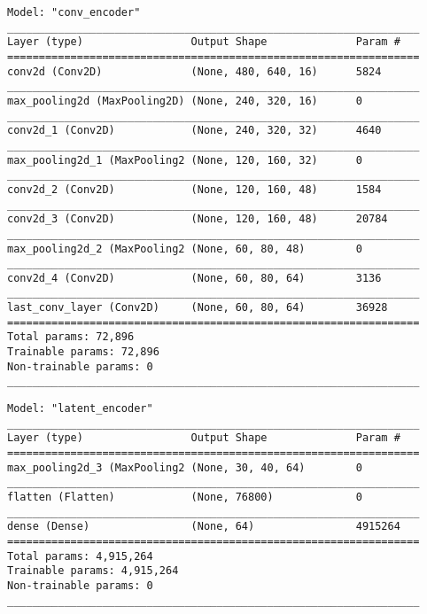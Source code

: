 \documentclass[12pt]{article}
\begin{document}
\begin{verbatim}
Model: "conv_encoder"
_________________________________________________________________
Layer (type)                 Output Shape              Param #   
=================================================================
conv2d (Conv2D)              (None, 480, 640, 16)      5824      
_________________________________________________________________
max_pooling2d (MaxPooling2D) (None, 240, 320, 16)      0         
_________________________________________________________________
conv2d_1 (Conv2D)            (None, 240, 320, 32)      4640      
_________________________________________________________________
max_pooling2d_1 (MaxPooling2 (None, 120, 160, 32)      0         
_________________________________________________________________
conv2d_2 (Conv2D)            (None, 120, 160, 48)      1584      
_________________________________________________________________
conv2d_3 (Conv2D)            (None, 120, 160, 48)      20784     
_________________________________________________________________
max_pooling2d_2 (MaxPooling2 (None, 60, 80, 48)        0         
_________________________________________________________________
conv2d_4 (Conv2D)            (None, 60, 80, 64)        3136      
_________________________________________________________________
last_conv_layer (Conv2D)     (None, 60, 80, 64)        36928     
=================================================================
Total params: 72,896
Trainable params: 72,896
Non-trainable params: 0
_________________________________________________________________
\end{verbatim}

\begin{verbatim}
Model: "latent_encoder"
_________________________________________________________________
Layer (type)                 Output Shape              Param #   
=================================================================
max_pooling2d_3 (MaxPooling2 (None, 30, 40, 64)        0         
_________________________________________________________________
flatten (Flatten)            (None, 76800)             0         
_________________________________________________________________
dense (Dense)                (None, 64)                4915264   
=================================================================
Total params: 4,915,264
Trainable params: 4,915,264
Non-trainable params: 0
_________________________________________________________________
\end{verbatim}
\end{document}
